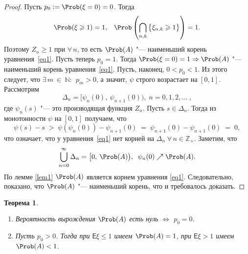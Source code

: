 \documentclass[a4paper]{article}
\newcommand{\Expect}{\mathsf{E}}
\theoremstyle{plain}
\newtheorem{thm}{Теорема}[section]
\theoremstyle{definition}
\theoremstyle{remark}
\begin{document}
\begin{proof}
  Пусть $p_{0} := \Prob(\xi = 0) = 0$. Тогда
  \begin{equation*}
    \Prob(\xi \geqslant 1) = 1{,}\quad \Prob\left(\bigcap_{n,k} \left\lbrace \xi_{n,k} \geqslant 1 \right\rbrace \right) = 1{.}
  \end{equation*}
  Поэтому $Z_{n} \geqslant 1$ при $\forall\, n$, то есть $\Prob(A)$ "--- наименьший корень уравнения~\eqref{eq1}.
  Пусть теперь $p_{0} = 1$. Тогда $\Prob(\xi = 0)=1 \Rightarrow \Prob(A)$ "--- наименьший корень уравнения~\eqref{eq1}.
  Пусть, наконец, $0 < p_{0} < 1$. Из этого следует, что $\exists\, m~\in~\mathbb{N}{:}\;\, p_{m} > 0$, а значит, $\psi$ строго возрастает на $[0, 1]$. Рассмотрим
  \begin{equation*}
    \Delta_{n} = \big[\psi_{n}(0),\: \psi_{n+1}\left(0\right)\big){,}\; n = 0, 1, 2, \ldots \; {,} %
  \end{equation*}
  где $\psi_{n}(s)$ "--- это производящая функция $Z_{n}$. Пусть $s \in \Delta_{n}$. Тогда из монотонности $\psi$ на $[0, 1]$ получаем, что
  \begin{equation*}
    \psi(s) - s \; > \; \psi(\psi_{n}(0)) - \psi_{n+1}(0) \; = \; \psi_{n+1}(0) - \psi_{n+1}(0) \; = \; 0{,}
  \end{equation*}
  что означает, что у уравнения~\eqref{eq1} нет корней на $\Delta_{n} \; \forall\, n \in \mathbb{Z_{+}}$.
  Заметим, что
  \begin{equation*}
    \bigcup_{n=0}^{\infty} \Delta_{n} = \big[0,\: \Prob(A)\big), \; \; \psi_{n}(0) \nearrow \Prob(A){.} %
  \end{equation*}
  По лемме \ref{lem1} $\Prob(A)$ является корнем уравнения \eqref{eq1}. Следовательно, показано, что $\Prob(A)$ "--- наименьший корень, что и требовалось доказать.
\end{proof}

\begin{thm}
 \begin{enumerate}
  \item Вероятность вырождения $\Prob(A)$ есть нуль $\Leftrightarrow$ $p_{0} = 0$. \item Пусть $p_{0} > 0$. Тогда при $\Expect \xi \leqslant 1$ имеем $\Prob (A) = 1$, при $\Expect \xi > 1$ имеем $\Prob(A) < 1$.
 \end{enumerate}
\end{thm}
\end{document}
